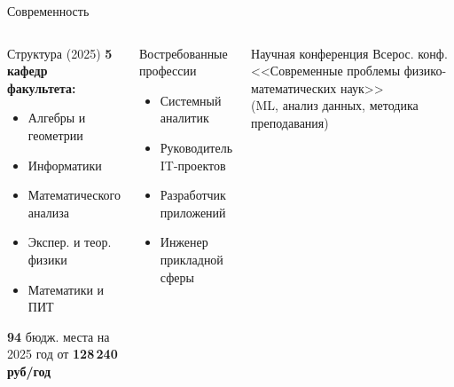\documentclass[12pt, aspectratio=169]{beamer}
\begin{document}
\begin{frame}{Современность}
  \begin{columns}[T]
      \begin{block}{Структура (2025)}
        \textbf{5 кафедр факультета:}
        \begin{itemize}
          \item Алгебры и геометрии
          \item Информатики
          \item Математического анализа
          \item Экспер. и теор. физики
          \item Математики и ПИТ
        \end{itemize}
        \medskip
        \textbf{94} бюдж. места на 2025 год \newline от \textbf{128\,240 руб/год}
      \end{block}
      \begin{block}{Востребованные профессии}
        \begin{itemize}
          \item Системный аналитик
          \item Руководитель IT-проектов
          \item Разработчик приложений
          \item Инженер прикладной сферы
        \end{itemize}
      \end{block}
      \vspace{0.3em}
      \begin{alertblock}{Научная конференция}
        \footnotesize Всерос. конф. <<Современные проблемы
        физико-математических наук>>\\
        (ML, анализ данных, методика преподавания)
      \end{alertblock}
  \end{columns}
\end{frame}
\end{document}
